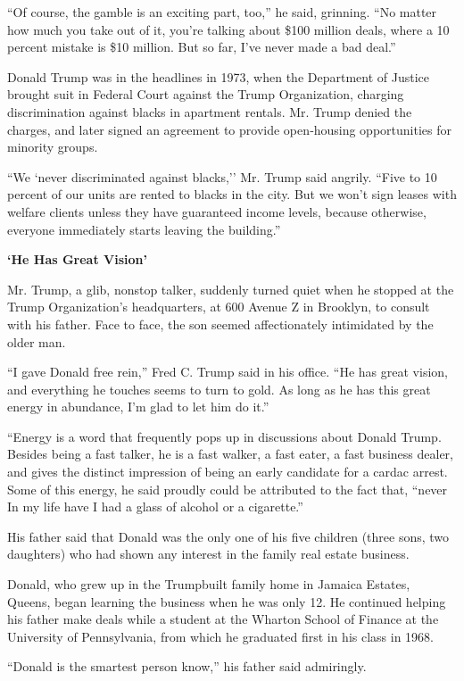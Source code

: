 ``Of course, the gamble is an exciting part, too,'' he said, grinning.
``No matter how much you take out of it, you're talking about \$100
million deals, where a 10 percent mistake is \$10 million. But so far,
I've never made a bad deal.''

Donald Trump was in the headlines in 1973, when the Department of
Justice brought suit in Federal Court against the Trump Organization,
charging discrimination against blacks in apartment rentals. Mr. Trump
denied the charges, and later signed an agreement to provide
open‐housing opportunities for minority groups.

``We `never discriminated against blacks,'' Mr. Trump said angrily.
``Five to 10 percent of our units are rented to blacks in the city. But
we won't sign leases with welfare clients unless they have guaranteed
income levels, because otherwise, everyone immediately starts leaving
the building.''

\textbf{`He Has Great Vision'}

Mr. Trump, a glib, nonstop talker, suddenly turned quiet when he stopped
at the Trump Organization's headquarters, at 600 Avenue Z in Brooklyn,
to consult with his father. Face to face, the son seemed affectionately
intimidated by the older man.

``I gave Donald free rein,'' Fred C. Trump said in his office. ``He has
great vision, and everything he touches seems to turn to gold. As long
as he has this great energy in abundance, I'm glad to let him do it.''

``Energy is a word that frequently pops up in discussions about Donald
Trump. Besides being a fast talker, he is a fast walker, a fast eater, a
fast business dealer, and gives the distinct impression of being an
early candidate for a cardac arrest. Some of this energy, he said
proudly could be attributed to the fact that, ``never In my life have I
had a glass of alcohol or a cigarette.''

His father said that Donald was the only one of his five children (three
sons, two daughters) who had shown any interest in the family real
estate business.

Donald, who grew up in the Trumpbuilt family home in Jamaica Estates,
Queens, began learning the business when he was only 12. He continued
helping his father make deals while a student at the Wharton School of
Finance at the University of Pennsylvania, from which he graduated first
in his class in 1968.

``Donald is the smartest person know,'' his father said admiringly.

